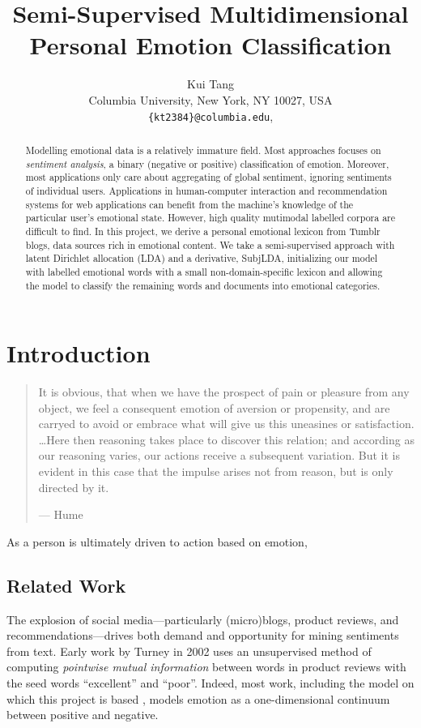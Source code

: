 \documentclass{article}
\title{Semi-Supervised Multidimensional Personal Emotion Classification}
\author{
Kui Tang\\
Columbia University, New York, NY 10027, USA\\
\texttt{\{kt2384\}@columbia.edu},
}
\begin{document}
\maketitle

\begin{abstract}
Modelling emotional data is a relatively immature field. Most
approaches focuses on \emph{sentiment analysis}, a binary (negative
or positive) classification of emotion. Moreover, most applications
only care about aggregating of global sentiment, ignoring sentiments
of individual users.  Applications in human-computer interaction
and recommendation systems for web applications can benefit from
the machine's knowledge of the particular user's emotional state.
However, high quality mutimodal labelled corpora are difficult to
find. In this project, we derive a personal emotional lexicon from
Tumblr blogs, data sources rich in emotional content. We take a
semi-supervised approach with latent Dirichlet allocation (LDA) and
a derivative, SubjLDA, initializing our model with labelled emotional
words with a small non-domain-specific lexicon and allowing the
model to classify the remaining words and documents into emotional
categories.
\end{abstract}

\section{Introduction}
\begin{quote}
It is obvious, that when we have the prospect of pain or pleasure
from any object, we feel a consequent emotion of aversion or
propensity, and are carryed to avoid or embrace what will give us
this uneasines or satisfaction. \ldots Here then reasoning takes
place to discover this relation; and according as our reasoning
varies, our actions receive a subsequent variation. But it is evident
in this case that the impulse arises not from reason, but is only
directed by it.

\hspace{9 cm} --- Hume \citep{hume}
\end{quote}
As a person is ultimately driven to action based on emotion, 

\label{sec:introduction}

\subsection{Related Work}
The explosion of social media---particularly (micro)blogs, product
reviews, and recommendations---drives both demand and opportunity
for mining sentiments from text. Early work by Turney in 2002
\citep{turney02} uses an unsupervised method of computing \emph{pointwise
mutual information} between words in product reviews with the seed
words ``excellent'' and ``poor''. Indeed, most work, including the
model on which this project is based \citep{lin03}, models emotion
as a one-dimensional continuum between positive and negative.
\end{document}
